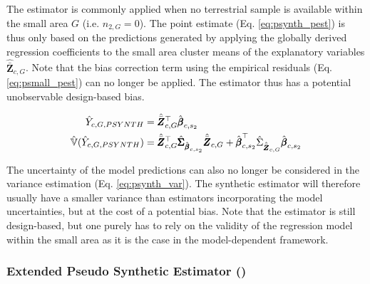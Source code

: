 The \psynth{} estimator is commonly applied when no terrestrial sample is available within the small area $G$ (i.e. $n_{2,G}=0$). The point estimate (Eq. \ref{eq:psynth_pest}) is thus only based on the predictions generated by applying the globally derived regression coefficients to the small area cluster means of the explanatory variables $\hat{\bar{\pmb{Z}}}_{c,G}$. Note that the bias correction term using the empirical residuals (Eq. \ref{eq:psmall_pest}) can no longer be applied. The \psynth{} estimator thus has a potential unobservable design-based bias.

\begin{subequations}\label{eq:psynth}
	\begin{align}
	\hat{Y}_{c,G,PSYNTH} & =\hat{\bar{\pmb{Z}}}_{c,G}^{\top}\hat{\pmb{\beta}}_{c,s_2} \label{eq:psynth_pest} \\
	\hat{\mathbb{V}}(\hat{Y}_{c,G,PSYNTH})& =
	\hat{\bar{\pmb{Z}}}_{c,G}^{\top}\hat{\pmb{\Sigma}}_{\hat{\pmb{\beta}}_{c,s_2}}
	\hat{\bar{\pmb{Z}}}_{c,G}
	+ \hat{\pmb{\beta}}^{\top}_{c,s_2}\hat{\Sigma}_{\hat{\bar{\pmb{Z}}}_{c,G}}\hat{\pmb{\beta}}_{c,s_2} \label{eq:psynth_var}
	\end{align}
\end{subequations}

The uncertainty of the model predictions can also no longer be considered in the variance estimation (Eq. \ref{eq:psynth_var}). The synthetic estimator will therefore usually have a smaller variance than estimators incorporating the model uncertainties, but at the cost of a potential bias. Note that the \psynth{} estimator is still design-based, but one purely has to rely on the validity of the regression model within the small area as it is the case in the model-dependent framework.\\

\subsubsection{Extended Pseudo Synthetic Estimator (\extpsynth{})}
\label{sec:extpsynth}

